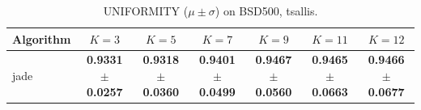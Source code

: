 \begin{table}[htbp]
\centering
\caption{UNIFORMITY ($\mu \pm \sigma$) on BSD500, tsallis.}
\label{tab:exp1-tsallis-uniformity}
\begin{tabular}{lcccccc}
\toprule
Algorithm & $K=3$ & $K=5$ & $K=7$ & $K=9$ & $K=11$ & $K=12$ \\
\midrule
jade & \textbf{0.9331 $\pm$ 0.0257} & \textbf{0.9318 $\pm$ 0.0360} & \textbf{0.9401 $\pm$ 0.0499} & \textbf{0.9467 $\pm$ 0.0560} & \textbf{0.9465 $\pm$ 0.0663} & \textbf{0.9466 $\pm$ 0.0677} \\
\bottomrule
\end{tabular}
\end{table}